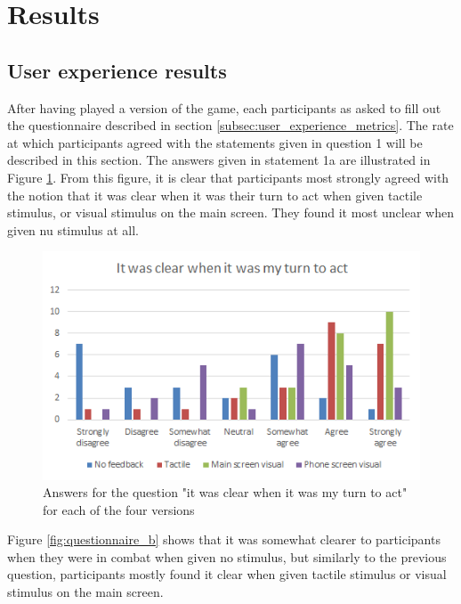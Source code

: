\section{Results}
\subsection{User experience results}
After having played a version of the game, each participants as asked to fill out the questionnaire described in section \ref{subsec:user_experience_metrics}. The rate at which participants agreed with the statements given in question 1 will be described in this section. The answers given in statement 1a are illustrated in Figure \ref{fig:questionnaire_a}. From this figure, it is clear that participants most strongly agreed with the notion that it was clear when it was their turn to act when given tactile stimulus, or visual stimulus on the main screen. They found it most unclear when given nu stimulus at all.

\begin{figure}[h!]
	\centering
	\includegraphics[scale=1]{figures/questionnaire_a.png}
	\caption{Answers for the question "it was clear when it was my turn to act" for each of the four versions}\label{fig:questionnaire_a}
\end{figure}

Figure \ref{fig:questionnaire_b} shows that it was somewhat clearer to participants when they were in combat when given no stimulus, but similarly to the previous question, participants mostly found it clear when given tactile stimulus or visual stimulus on the main screen.

